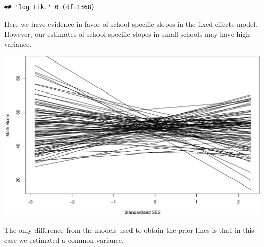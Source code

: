 \documentclass[ignorenonframetext,]{beamer}
\newenvironment{Shaded}{\begin{snugshade}}{\end{snugshade}}
\newcommand{\KeywordTok}[1]{\textcolor[rgb]{0.13,0.29,0.53}{\textbf{#1}}}
\newcommand{\DecValTok}[1]{\textcolor[rgb]{0.00,0.00,0.81}{#1}}
\newcommand{\CommentTok}[1]{\textcolor[rgb]{0.56,0.35,0.01}{\textit{#1}}}
\newcommand{\OperatorTok}[1]{\textcolor[rgb]{0.81,0.36,0.00}{\textbf{#1}}}
\newcommand{\NormalTok}[1]{#1}
\begin{document}
\begin{frame}[fragile]{}

\begin{Shaded}
\end{Shaded}

\begin{verbatim}
## 'log Lik.' 0 (df=1368)
\end{verbatim}

Here we have evidence in favor of school-specific slopes in the fixed
effects model. However, our estimates of school-specific slopes in small
schools may have high variance.

\end{frame}

\begin{frame}{}

\includegraphics{anova_06_deck_files/figure-beamer/plotslopes-1.pdf}

The only difference from the models used to obtain the prior lines is
that in this case we estimated a common variance.

\end{frame}
\end{document}
